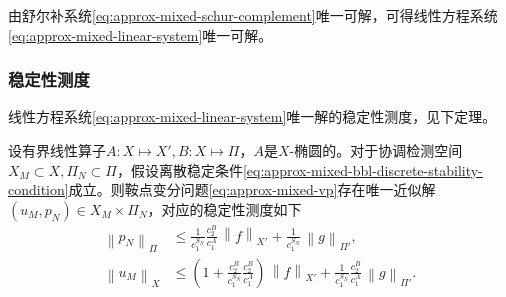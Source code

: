由舒尔补系统\eqref{eq:approx-mixed-schur-complement}唯一可解，可得线性方程系统\eqref{eq:approx-mixed-linear-system}唯一可解。

\subsubsection{稳定性测度}
线性方程系统\eqref{eq:approx-mixed-linear-system}唯一解的稳定性测度，见下定理。
\begin{theorem}[唯一解的稳定性测度]
  \label{theorem:approx-mixed-linear-system-stability-estimate}
  设有界线性算子$A:X \mapsto X', B: X \mapsto \Pi$，$A$是$X$-椭圆的。对于协调检测空间$X_{M} \subset X, \Pi_{N} \subset \Pi$，假设离散稳定条件\eqref{eq:approx-mixed-bbl-discrete-stability-condition}成立。则鞍点变分问题\eqref{eq:approx-mixed-vp}存在唯一近似解$\left( u_{M}, p_{N} \right) \in X_{M} \times \Pi_{N}$，对应的稳定性测度如下
  \begin{align}
    \label{eq:approx-mixed-linear-system-stability-estimate-p}
    \left\| p_{N} \right\|_{\Pi}
    & \le \frac{1}{c_{1}^{S_{N}}} \frac{c_{2}^{B}}{c_{1}^{A}}
    \, \left\| f \right\|_{X'}
    + \frac{1}{c_{1}^{S_{N}}} \, \left\| g \right\|_{\Pi'}, \\
    \label{eq:approx-mixed-linear-system-stability-estimate-u}
    \left\| u_{M} \right\|_{X}
    & \le \left(
    1 + \frac{c_{2}^{B}}{c_{1}^{S_{N}}} \frac{c_{2}^{B}}{c_{1}^{A}}
    \right) \,
    \left\| f \right\|_{X'}
    + \frac{1}{c_{1}^{S_{N}}} \frac{c_{2}^{B}}{c_{1}^{A}} \,
    \left\| g \right\|_{\Pi'}.
  \end{align}
\end{theorem}

